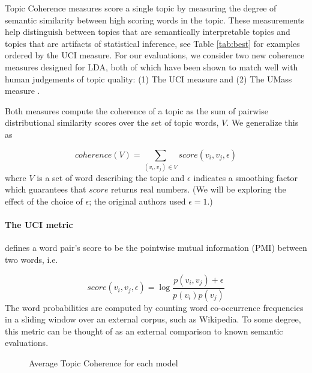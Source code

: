 \label{sec:coherence-metrics}
Topic Coherence measures score a single topic by measuring the degree of semantic
similarity between high scoring words in the topic.  These measurements help
distinguish between topics that are semantically interpretable topics and topics
that are artifacts of statistical inference, see Table \ref{tab:best} for
examples ordered by the UCI measure.  For our evaluations, we consider two new
coherence measures designed for LDA, both of which have been shown to match well
with human judgements of topic quality: (1) The UCI measure \cite{newman10uci}
and (2) The UMass measure \cite{mimno11umass}.

Both measures compute the coherence of a topic as the
sum of pairwise distributional similarity scores over the set of topic
words, $V$.  We generalize this as

$$coherence(V) = \sum_{(v_i, v_j) \in V} score(v_i, v_j, \epsilon)$$
\noindent
where $V$ is a set of word describing the topic and $\epsilon$ indicates a
smoothing factor which guarantees that $score$ returns real numbers.
(We will be exploring the effect of the choice of $\epsilon$; the
original authors used $\epsilon=1$.)

\paragraph{The UCI metric} defines a word pair's score to be the pointwise
mutual information (PMI) between two words, i.e.

$$score(v_i,v_j,\epsilon) = \log \frac{p(v_i, v_j) + \epsilon}{p(v_i)p(v_j)}$$
\noindent
The word probabilities are computed by counting word co-occurrence frequencies
in a sliding window over an external corpus, such as Wikipedia.  To some degree,
this metric can be thought of as an external comparison to known semantic
evaluations.

\begin{figure}[h!t!b!]
  \centering
  \caption{Average Topic Coherence for each model}
  \label{fig:mean}
\end{figure}

